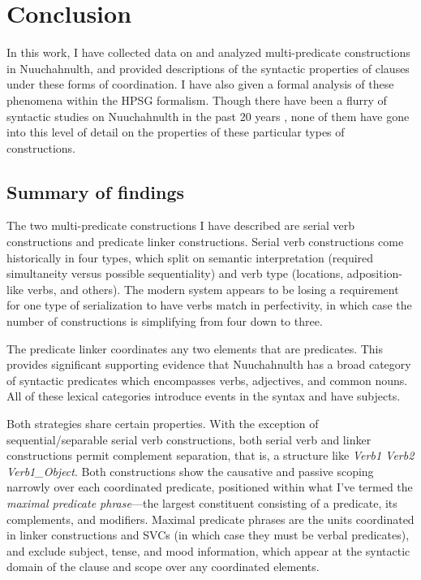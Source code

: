 \chapter{Conclusion} \label{ch:conclusion}

In this work, I have collected data on and analyzed multi-predicate constructions in Nuuchahnulth, and provided descriptions of the syntactic properties of clauses under these forms of coordination. I have also given a formal analysis of these phenomena within the HPSG formalism. Though there have been a flurry of syntactic studies on Nuuchahnulth in the past 20 years \citep{nakayama2001, davidson2002, waldie2004, wojdak2005, woo2007b, waldie2012}, none of them have gone into this level of detail on the properties of these particular types of constructions.

\section{Summary of findings}

The two multi-predicate constructions I have described are serial verb constructions and predicate linker constructions. Serial verb constructions come historically in four types, which split on semantic interpretation (required simultaneity versus possible sequentiality) and verb type (locations, adposition-like verbs, and others). The modern system appears to be losing a requirement for one type of serialization to have verbs match in perfectivity, in which case the number of constructions is simplifying from four down to three.

The predicate linker coordinates any two elements that are predicates. This provides significant supporting evidence that Nuuchahnulth has a broad category of syntactic predicates which encompasses verbs, adjectives, and common nouns. All of these lexical categories introduce events in the syntax and have subjects.

Both strategies share certain properties. With the exception of 	sequential/separable serial verb constructions, both serial verb and linker constructions permit complement separation, that is, a structure like \textit{Verb1 Verb2 Verb1\_Object}. Both constructions show the causative and passive scoping narrowly over each coordinated predicate, positioned within what I've termed the \textit{maximal predicate phrase}---the largest constituent consisting of a predicate, its complements, and modifiers. Maximal predicate phrases are the units coordinated in linker constructions and SVCs (in which case they must be verbal predicates), and exclude subject, tense, and mood information, which appear at the syntactic domain of the clause and scope over any coordinated elements.

